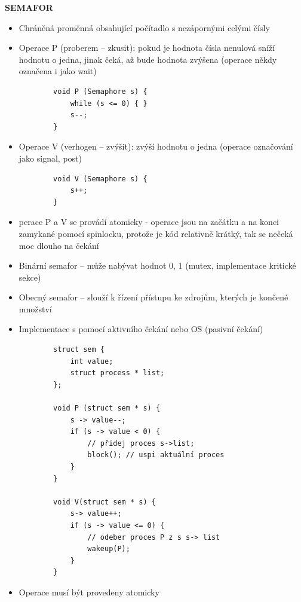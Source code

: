 \documentclass[10pt,a4paper]{article}
\begin{document}
\textbf{SEMAFOR}
\begin{itemize}
	\item Chráněná proměnná obsahující počítadlo s nezápornými celými čísly
	\item Operace P (proberem – zkusit): pokud je hodnota čísla nenulová sníží hodnotu o jedna, jinak čeká, až bude hodnota zvýšena (operace někdy označena i jako wait)
	\begin{verbatim}
		void P (Semaphore s) {
			while (s <= 0) { }
			s--;
		}
	\end{verbatim}
	\item Operace V (verhogen – zvýšit): zvýší hodnotu o jedna (operace označování jako signal, post)
	\begin{verbatim}
		void V (Semaphore s) {
			s++;
		}
	\end{verbatim}
	\item perace P a V se provádí atomicky - operace jsou na začátku a na konci zamykané pomocí spinlocku, protože je kód relativně krátký, tak se nečeká moc dlouho na čekání
	\item Binární semafor – může nabývat hodnot 0, 1 (mutex, implementace kritické sekce)
	\item Obecný semafor – slouží k řízení přístupu ke zdrojům, kterých je končené množství
	\item Implementace s pomocí aktivního čekání nebo OS (pasivní čekání)
	\begin{verbatim}
		struct sem {
			int value;
			struct process * list;
		};
		
		void P (struct sem * s) {
			s -> value--;
			if (s -> value < 0) {
				// přidej proces s->list;
				block(); // uspi aktuální proces
			}
		}
		
		void V(struct sem * s) {
			s-> value++;
			if (s -> value <= 0) {
				// odeber proces P z s s-> list
				wakeup(P);
			}
		}
	\end{verbatim}
	\item Operace musí být provedeny atomicky
\end{itemize}
\end{document}
